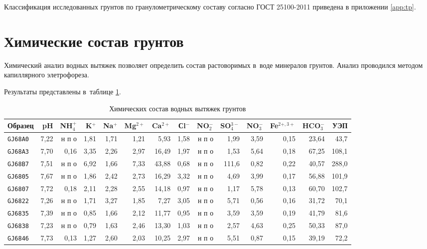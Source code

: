 Классификация исследованных грунтов по гранулометрическому составу согласно ГОСТ 25100-2011 \cite{gost25100} приведена в приложении \ref{app:tp}.

 
\section{Химические состав грунтов}

Химический анализ водных вытяжек позволяет определить состав растоворимых в~воде минералов грунтов.
Анализ проводился методом капиллярного элетрофореза. 

Результаты представлены в~таблице \ref{tab:chem}.

\begin{table}[]
    \centering
    \tiny
    \caption{Химических состав водных вытяжек грунтов} \label{tab:chem}
    \begin{tabular}{@{}lrrrrrrrrrrrrr@{}}
    \toprule
    Образец & pH & NH$_4^+$ &	K$^+$ & Na$^+$ & Mg$^{2+}$ & Ca$^{2+}$ &	Сl$^-$ &	NO$_2^-$	   & SO$_4^{3-}$ &	NO$_3^-$ &	Fe$^{2+,3+}$ &	HCO$_3^-$   & УЭП \\ \midrule
    \texttt{GJ68A0} & 7,22 & н п о & 1,81 & 1,71 & 1,21 &  5,93 & 1,58 & н п о &  1,99 & 3,59 & 0,15 & 23,64 &  43,7 \\
    \texttt{GJ68A3} & 7,70 & 0,16  & 3,35 & 2,26 & 2,97 & 16,49 & 1,97 & н п о &  1,53 & 5,64 & 0,18 & 67,25 & 108,1 \\
    \texttt{GJ68B7} & 7,51 & н п о & 6,92 & 1,66 & 7,33 & 43,88 & 0,68 & н п о & 111,6 & 0,82 & 0,22 & 40,57 & 288,0 \\
    \texttt{GJ6805} & 7,67 & н п о & 1,86 & 2,42 & 2,73 & 16,29 & 3,32 & н п о &  4,69 & 3,99 & 0,17 & 56,88 & 101,9 \\
    \texttt{GJ6807} & 7,72 & 0,18  & 2,11 & 2,28 & 2,55 & 14,18 & 0,97 & н п о &  1,17 & 5,78 & 0,13 & 60,70 & 102,7 \\
    \texttt{GJ6822} & 7,26 & н п о & 1,71 & 3,27 & 1,85 &  7,27 & 3,05 & н п о &  5,71 & 0,56 & 0,16 & 31,72 &  70,1 \\
    \texttt{GJ6835} & 7,39 & н п о & 0,85 & 1,66 & 2,12 & 11,77 & 0,95 & н п о &  3,59 & 3,59 & 0,19 & 41,79 &  81,6 \\
    \texttt{GJ6838} & 7,23 & н п о & 0,79 & 1,63 & 2,46 & 13,30 & 1,03 & н п о &  2,57 & 4,63 & 0,25 & 50,33 &  87,0 \\
    \texttt{GJ6846} & 7,73 & 0,13  & 1,27 & 2,60 & 2,03 & 10,25 & 2,97 & н п о &  5,51 & 0,87 & 0,15 & 39,19 &  72,2 \\

\end{tabular}
\end{table}
